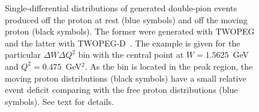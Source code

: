 \begin{figure}[htp]
\begin{center}
\caption{\small Single-differential distributions of generated double-pion events produced off the proton at rest (blue symbols) and off the moving proton (black symbols). The former were generated with TWOPEG~\cite{twopeg} and the latter with TWOPEG-D~\cite{twopeg-d}. The example is given for the particular $\Delta W \Delta Q^{2}$ bin with the central point at $W=1.5625$~GeV and $Q^{2}=0.475$~GeV$^{2}$. As the bin is located in the peak region, the moving proton distributions (black symbols) have a small relative event deficit comparing with the free proton distributions (blue symbols). See text for details. } \label{ferm_cor_1diff_2}
\end{center}
\end{figure}

